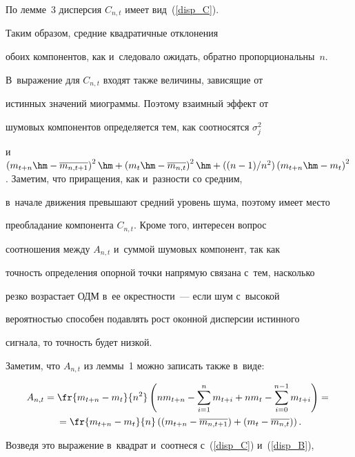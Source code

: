 По лемме~3 дисперсия $C_{n,t}$ имеет вид~(\ref{disp_C}).


Таким образом, средние квадратичные отклонения


обоих компонентов, как и~следовало ожидать, обратно пропорциональны~$n$.


В~выражение для $C_{n,t}$ входят также величины, зависящие от


истинных значений миограммы. Поэтому взаимный эффект от


шумовых компонентов определяется тем, как соотносятся $\sigma_j^2$


и~$\left(m_{t+n} \hm- \overline{m_{n,t+1}}\right)^2 \hm+ \left(m_t \hm-


\overline{m_{n,t}}\right)^2\hm + (({n-1})/{n^2})\left(m_{t+n} \hm-


m_t\right)^2$. Заметим, что приращения, как и~разности со средним,


в~начале движения превышают средний уровень шума, поэтому имеет место


преобладание компонента $C_{n,t}$. Кроме того, интересен вопрос


соотношения между $A_{n,t}$ и~суммой шумовых компонент, так как


точность определения опорной точки напрямую связана с~тем, насколько


резко возрастает ОДМ в~ее окрестности~--- если шум с~высокой


вероятностью способен подавлять рост оконной дисперсии истинного


сигнала, то точность будет низкой.





    Заметим, что $A_{n,t}$ из леммы~1 можно записать также в~виде:


    \begin{multline*}


        A_{n,t} = \fr{m_{t+n}-m_t}{n^2}\left(nm_{t+n} -


        \sum\limits^{n}_{i=1}m_{t+i}+ nm_t-\sum\limits^{n-1}_{i=0}m_{t+i}\right) ={}\\


        {}=\fr{m_{t+n}-m_t}{n}\left(\left(m_{t+n}-\overline{m_{n,t+1}}\right) + \left(m_t - \overline{m_{n,t}}\right)\right).


    \end{multline*}


    Возведя это выражение в~квадрат и~соотнеся с~(\ref{disp_C}) и~(\ref{disp_B}),


